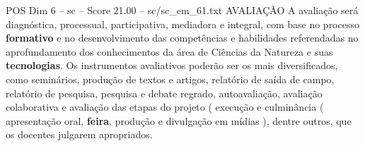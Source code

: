 \begin{textsample}{POS Dim 6 – sc – Score 21.00 – sc/sc\_em\_61.txt}
AVALIAÇÃO A avaliação será diagnóstica, processual, participativa, mediadora e integral, com base no processo \textbf{formativo} e no desenvolvimento das competências e habilidades referendadas no aprofundamento dos conhecimentos da área de Ciências da Natureza e suas \textbf{tecnologias}.
Os instrumentos avaliativos poderão ser os mais diversificados, como seminários, produção de textos e artigos, relatório de saída de campo, relatório de pesquisa, pesquisa e debate regrado, autoavaliação, avaliação colaborativa e avaliação das etapas do projeto ( execução e culminância ( apresentação oral, \textbf{feira}, produção e divulgação em mídias ), dentre outros, que os docentes julgarem apropriados.

\end{textsample}

